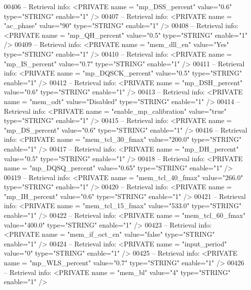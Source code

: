 \begin{DoxyCode}
{00406 \textcolor{keyword}{-- Retrieval info:      <PRIVATE name = "mp\_DSS\_percent" value="0.6"  type="STRING"  enable="1" />}
00407 \textcolor{keyword}{-- Retrieval info:      <PRIVATE name = "ac\_phase" value="90"  type="STRING"  enable="1" />}
00408 \textcolor{keyword}{-- Retrieval info:      <PRIVATE name = "mp\_QH\_percent" value="0.5"  type="STRING"  enable="1" />}
00409 \textcolor{keyword}{-- Retrieval info:      <PRIVATE name = "mem\_dll\_en" value="Yes"  type="STRING"  enable="1" />}
00410 \textcolor{keyword}{-- Retrieval info:      <PRIVATE name = "mp\_IS\_percent" value="0.7"  type="STRING"  enable="1" />}
00411 \textcolor{keyword}{-- Retrieval info:      <PRIVATE name = "mp\_DQSCK\_percent" value="0.5"  type="STRING"  enable="1" />}
00412 \textcolor{keyword}{-- Retrieval info:      <PRIVATE name = "mp\_DSH\_percent" value="0.6"  type="STRING"  enable="1" />}
00413 \textcolor{keyword}{-- Retrieval info:      <PRIVATE name = "mem\_odt" value="Disabled"  type="STRING"  enable="1" />}
00414 \textcolor{keyword}{-- Retrieval info:      <PRIVATE name = "enable\_mp\_calibration" value="true"  type="STRING"  enable="1" />}
00415 \textcolor{keyword}{-- Retrieval info:      <PRIVATE name = "mp\_DS\_percent" value="0.6"  type="STRING"  enable="1" />}
00416 \textcolor{keyword}{-- Retrieval info:      <PRIVATE name = "mem\_tcl\_30\_fmax" value="200.0"  type="STRING"  enable="1" />}
00417 \textcolor{keyword}{-- Retrieval info:      <PRIVATE name = "mp\_DH\_percent" value="0.5"  type="STRING"  enable="1" />}
00418 \textcolor{keyword}{-- Retrieval info:      <PRIVATE name = "mp\_DQSQ\_percent" value="0.65"  type="STRING"  enable="1" />}
00419 \textcolor{keyword}{-- Retrieval info:      <PRIVATE name = "mem\_tcl\_40\_fmax" value="266.0"  type="STRING"  enable="1" />}
00420 \textcolor{keyword}{-- Retrieval info:      <PRIVATE name = "mp\_IH\_percent" value="0.6"  type="STRING"  enable="1" />}
00421 \textcolor{keyword}{-- Retrieval info:      <PRIVATE name = "mem\_tcl\_15\_fmax" value="533.0"  type="STRING"  enable="1" />}
00422 \textcolor{keyword}{-- Retrieval info:      <PRIVATE name = "mem\_tcl\_60\_fmax" value="400.0"  type="STRING"  enable="1" />}
00423 \textcolor{keyword}{-- Retrieval info:      <PRIVATE name = "mem\_if\_oct\_en" value="false"  type="STRING"  enable="1" />}
00424 \textcolor{keyword}{-- Retrieval info:      <PRIVATE name = "input\_period" value="0"  type="STRING"  enable="1" />}
00425 \textcolor{keyword}{-- Retrieval info:      <PRIVATE name = "mp\_WLS\_percent" value="0.7"  type="STRING"  enable="1" />}
00426 \textcolor{keyword}{-- Retrieval info:      <PRIVATE name = "mem\_bl" value="4"  type="STRING"  enable="1" />}
}
\end{DoxyCode}
